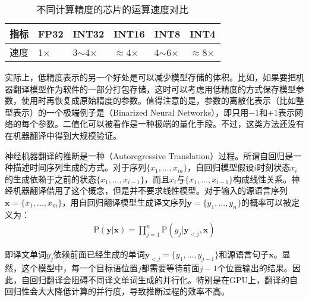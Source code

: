 \begin{itemize}
\begin{table}[htp]
\centering
\caption{不同计算精度的芯片的运算速度对比\protect\footnotemark}
\begin{tabular}{ l | l  l l l l}
\rule{0pt}{13pt} 指标 & FP32 &INT32 &INT16 &INT8 &INT4 \\ \hline
\rule{0pt}{13pt} 速度 & 1$\times$ & 3$\sim$4$\times$ & $\approx$4$\times$ & 4$\sim$6$\times$ & $\approx$8$\times$
\end{tabular}
\label{tab:7-4}
\end{table}

\vspace{0.5em}
\end{itemize}

\parinterval 实际上，低精度表示的另一个好处是可以减少模型存储的体积。比如，如果要把机器翻译模型作为软件的一部分打包存储，这时可以考虑用低精度的方式保存模型参数，使用时再恢复成原始精度的参数。值得注意的是，参数的离散化表示（比如整型表示）的一个极端例子是{\small{}}（Binarized Neural Networks）\cite{DBLP:conf/nips/HubaraCSEB16}，即只用$-1$和$+1$表示网络的每个参数。二值化可以被看作是一种极端的量化手段。不过，这类方法还没有在机器翻译中得到大规模验证。

\vspace{0.5em}
\vspace{0.5em}

\parinterval 神经机器翻译的推断是一种{\small{}}（Autoregressive Translation）过程。所谓自回归是一种描述时间序列生成的方式。对于序列$\{ x_1,...,x_m \}$，自回归模型假设$i$时刻状态$x_i$的生成依赖于之前的状态$\{ x_1,...,x_{i-1} \}$，而且$x_i$与$\{ x_1,...,x_{i-1} \}$构成线性关系。神经机器翻译借用了这个概念，但是并不要求线性模型。对于输入的源语言序列$\mathbf{x}=\{ x_1,...,x_m \}$，用自回归翻译模型生成译文序列$\mathbf{y}=\{ y_1,...,y_n \}$的概率可以被定义为：
\begin{eqnarray}
\textrm{P}(\mathbf{y}|\mathbf{x}) = \prod_{j=1}^{n} \textrm{P}(y_j|\mathbf{y}_{<j},\mathbf{x})
\label{eq:7-6}
\end{eqnarray}

\noindent 即译文单词$y_j$依赖前面已经生成的单词$\mathbf{y}_{<j}=\{y_1,...,y_{j-1}\}$和源语言句子$\mathbf{x}$。显然，这个模型中，每一个目标语位置$j$都需要等待前面$j-1$个位置输出的结果。因此，自回归翻译会阻碍不同译文单词生成的并行化。特别是在GPU上，翻译的自回归性会大大降低计算的并行度，导致推断过程的效率不高。

